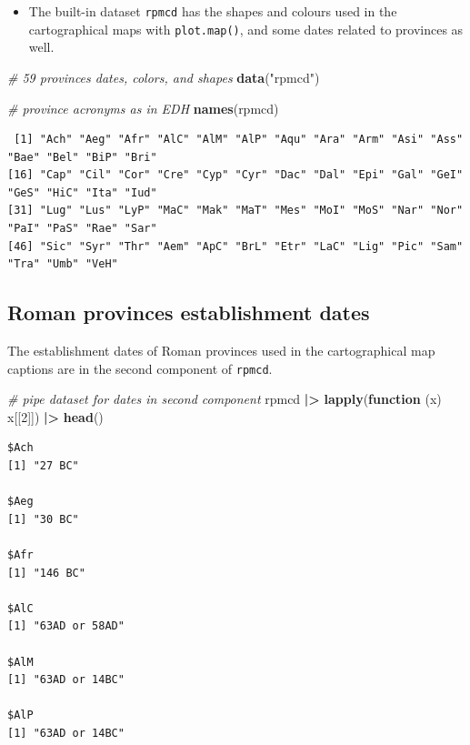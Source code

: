 \documentclass[a4paper,11pt]{memoir}
\newenvironment{Shaded}{\begin{snugshade}}{\end{snugshade}}
\newcommand{\CommentTok}[1]{\textcolor[rgb]{0.56,0.35,0.01}{\textit{#1}}}
\newcommand{\ControlFlowTok}[1]{\textcolor[rgb]{0.13,0.29,0.53}{\textbf{#1}}}
\newcommand{\DecValTok}[1]{\textcolor[rgb]{0.00,0.00,0.81}{#1}}
\newcommand{\ErrorTok}[1]{\textcolor[rgb]{0.64,0.00,0.00}{\textbf{#1}}}
\newcommand{\KeywordTok}[1]{\textcolor[rgb]{0.13,0.29,0.53}{\textbf{#1}}}
\newcommand{\NormalTok}[1]{#1}
\newcommand{\OperatorTok}[1]{\textcolor[rgb]{0.81,0.36,0.00}{\textbf{#1}}}
\newcommand{\StringTok}[1]{\textcolor[rgb]{0.31,0.60,0.02}{#1}}
\providecommand{\tightlist}{%
  \setlength{\itemsep}{0pt}\setlength{\parskip}{0pt}}
\begin{document}
\begin{itemize}
\tightlist
\item
  The built-in dataset \texttt{rpmcd} has the shapes and colours used in
  the cartographical maps with \texttt{plot.map()}, and some dates
  related to provinces as well.
\end{itemize}

\begin{Shaded}
\begin{Highlighting}[]
\CommentTok{# 59 provinces dates, colors, and shapes}
\KeywordTok{data}\NormalTok{(}\StringTok{"rpmcd"}\NormalTok{)}

\CommentTok{# province acronyms as in EDH}
\KeywordTok{names}\NormalTok{(rpmcd)}
\end{Highlighting}
\end{Shaded}

\begin{verbatim}
 [1] "Ach" "Aeg" "Afr" "AlC" "AlM" "AlP" "Aqu" "Ara" "Arm" "Asi" "Ass" "Bae" "Bel" "BiP" "Bri"
[16] "Cap" "Cil" "Cor" "Cre" "Cyp" "Cyr" "Dac" "Dal" "Epi" "Gal" "GeI" "GeS" "HiC" "Ita" "Iud"
[31] "Lug" "Lus" "LyP" "MaC" "Mak" "MaT" "Mes" "MoI" "MoS" "Nar" "Nor" "PaI" "PaS" "Rae" "Sar"
[46] "Sic" "Syr" "Thr" "Aem" "ApC" "BrL" "Etr" "LaC" "Lig" "Pic" "Sam" "Tra" "Umb" "VeH"
\end{verbatim}

\hypertarget{roman-provinces-establishment-dates}{%
\subsection{Roman provinces establishment
dates}\label{roman-provinces-establishment-dates}}

The establishment dates of Roman provinces used in the cartographical
map captions are in the second component of \texttt{rpmcd}.

\begin{Shaded}
\begin{Highlighting}[]
\CommentTok{# pipe dataset for dates in second component}
\NormalTok{rpmcd }\OperatorTok{|}\ErrorTok{>}\StringTok{ }
\StringTok{  }\KeywordTok{lapply}\NormalTok{(}\ControlFlowTok{function}\NormalTok{ (x) x[[}\DecValTok{2}\NormalTok{]]) }\OperatorTok{|}\ErrorTok{>}\StringTok{ }
\StringTok{  }\KeywordTok{head}\NormalTok{()}
\end{Highlighting}
\end{Shaded}

\begin{verbatim}
$Ach
[1] "27 BC"

$Aeg
[1] "30 BC"

$Afr
[1] "146 BC"

$AlC
[1] "63AD or 58AD"

$AlM
[1] "63AD or 14BC"

$AlP
[1] "63AD or 14BC"
\end{verbatim}
\end{document}
